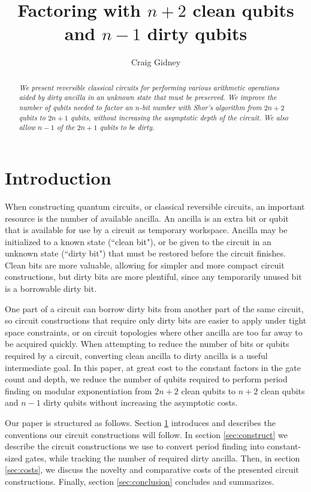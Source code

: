 \documentclass[twocolumn]{article}
\title{Factoring with $n+2$ clean qubits and $n-1$ dirty qubits}
\author{Craig Gidney}
\begin{document}
\maketitle

\begin{abstract}
\em
We present reversible classical circuits for performing various arithmetic operations aided by dirty ancilla in an unknown state that must be preserved.
We improve the number of qubits needed to factor an $n$-bit number with Shor's algorithm \cite{Shor1999} from $2n+2$ qubits \cite{takahashi2006, haner2016} to $2n+1$ qubits, without increasing the asymptotic depth of the circuit.
We also allow $n-1$ of the $2n+1$ qubits to be dirty.
\end{abstract}

\section{Introduction} \label{sec:introduction}

When constructing quantum circuits, or classical reversible circuits, an important resource is the number of available ancilla.
An ancilla is an extra bit or qubit that is available for use by a circuit as temporary workspace.
Ancilla may be initialized to a known state (``clean bit"), or be given to the circuit in an unknown state (``dirty bit") that must be restored before the circuit finishes.
Clean bits are more valuable, allowing for simpler and more compact circuit constructions, but dirty bits are more plentiful, since any temporarily unused bit is a borrowable dirty bit.

One part of a circuit can borrow dirty bits from another part of the same circuit, so circuit constructions that require only dirty bits are easier to apply under tight space constraints, or on circuit topologies where other ancilla are too far away to be acquired quickly.
When attempting to reduce the number of bits or qubits required by a circuit, converting clean ancilla to dirty ancilla is a useful intermediate goal.
In this paper, at great cost to the constant factors in the gate count and depth, we reduce the number of qubits required to perform period finding on modular exponentiation from $2n+2$ clean qubits \cite{takahashi2006, haner2016} to $n+2$ clean qubits and $n-1$ dirty qubits without increasing the asymptotic costs.

Our paper is structured as follows.
Section \ref{sec:introduction} introduces and describes the conventions our circuit constructions will follow.
In section \ref{sec:construct} we describe the circuit constructions we use to convert period finding into constant-sized gates, while tracking the number of required dirty ancilla.
Then, in section \ref{sec:costs}, we discuss the novelty and comparative costs of the presented circuit constructions.
Finally, section \ref{sec:conclusion} concludes and summarizes.
\end{document}
